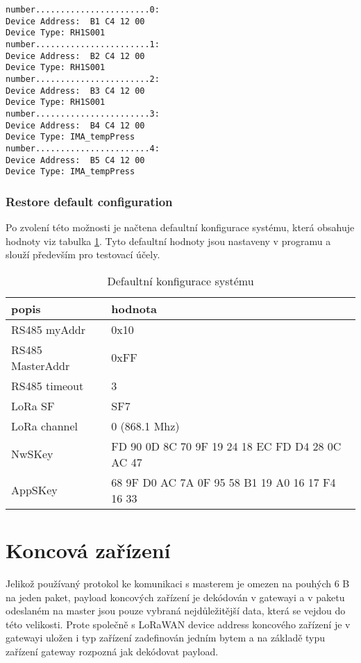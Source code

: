 \begin{lstlisting}
number.......................0:
Device Address:  B1 C4 12 00
Device Type: RH1S001
number.......................1:
Device Address:  B2 C4 12 00
Device Type: RH1S001
number.......................2:
Device Address:  B3 C4 12 00
Device Type: RH1S001
number.......................3:
Device Address:  B4 C4 12 00
Device Type: IMA_tempPress
number.......................4:
Device Address:  B5 C4 12 00
Device Type: IMA_tempPress
\end{lstlisting}



\subsubsection{Restore default configuration}
Po zvolení této možnosti je načtena defaultní konfigurace systému, která obsahuje hodnoty viz tabulka \ref{table:5}. Tyto defaultní hodnoty jsou nastaveny v programu a slouží především pro testovací účely.

\begin{table}[!h]
    \centering
    \begin{tabular}{ |l|l| }
     \hline

     popis              & hodnota         \\ \hline \hline
     RS485 myAddr       & 0x10            \\ \hline
     RS485 MasterAddr   & 0xFF            \\ \hline
     RS485 timeout      & 3               \\ \hline
     LoRa SF            & SF7             \\ \hline
     LoRa channel       & 0 (868.1 Mhz)   \\ \hline
     NwSKey             & FD 90 0D 8C 70 9F 19 24 18 EC FD D4 28 0C AC 47  \\ \hline
     AppSKey            & 68 9F D0 AC 7A 0F 95 58 B1 19 A0 16 17 F4 16 33  \\ \hline

    \end{tabular}
    \caption{Defaultní konfigurace systému}
    \label{table:5}
\end{table}


\newpage
\section{Koncová zařízení}
Jelikož používaný protokol ke komunikaci s masterem je omezen na pouhých 6 B na jeden paket, payload koncových zařízení je dekódován v gatewayi a v paketu odeslaném na master jsou pouze vybraná nejdůležitější data, která se vejdou do této velikosti.
Prote společně s LoRaWAN device address koncového zařízení je v gatewayi uložen i typ zařízení zadefinován jedním bytem a na základě typu zařízení gateway rozpozná jak dekódovat payload.

